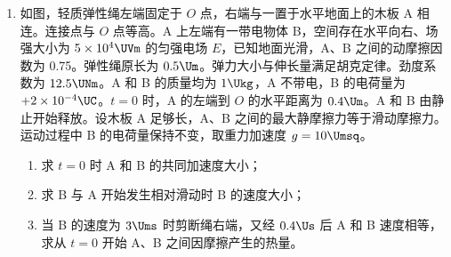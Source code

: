 \documentclass[\gkver]{gaokaozhenti}
\begin{document}
\begin{enumerate}
{（2）入射点 A 到中心线 $O_{1}O_{2}$ 的竖直距离为 $\frac{\sqrt{3}}{2}R$，圆形区域 Ⅱ 的圆心 O 在中心线上，因此 $OA$ 与水平中心线的夹角满足 $\sin\theta=\frac{\frac{\sqrt{3}R}{2}}{R}=\frac{\sqrt{3}}{2}$，即 $\theta=60^{\circ}$。

由于 A、C 关于 $O_{1}O_{2}$ 对称，粒子在区域 Ⅱ 中轨迹对应的圆心角为 $180^{\circ}$，由几何关系可得粒子做圆周运动的轨道半径 $r_{1}=R\sin 60^{\circ}=\frac{\sqrt{3}R}{2}$。

洛伦兹力提供向心力：$qv_{0}B_{2}=m\frac{v_{0}^{2}}{r_{1}}$，得 $B_{2}=\frac{2\sqrt{3}mv_{0}}{3qR}$。

粒子在磁场中运动的周期 $T=\frac{2\pi m}{qB_{2}}$，轨迹圆心角为 $\pi$，因此运动时间 $t=\frac{1}{2}T=\frac{\sqrt{3}\pi R}{2v_{0}}$。

（3）调整后粒子从 A 点水平向右入射，从与 O 等高的 D 点射出区域 Ⅱ，由几何关系 $\left(r_{2}-\frac{\sqrt{3}}{2}R\right)^{2}+\left(R+\frac{\sqrt{3}}{2}R\tan 30^{\circ}\right)^{2}=r_{2}^{2}$，得轨道半径 $r_{2}=\sqrt{3}R$。


代入洛伦兹向心力公式 $qv_{0}B_{2}'=m\frac{v_{0}^{2}}{r_{2}}$，得 $B_{2}'=\frac{\sqrt{3}mv_{0}}{3qR}$。
}

\item
如图，轻质弹性绳左端固定于 $O$ 点，右端与一置于水平地面上的木板 A 相连。连接点与 $O$ 点等高。A 上左端有一带电物体 B，空间存在水平向右、场强大小为 $5\times10^{4} \UVm$ 的匀强电场 $E$，已知地面光滑，A、B 之间的动摩擦因数为 0.75。弹性绳原长为 $0.5 \Um$。弹力大小与伸长量满足胡克定律。劲度系数为 $12.5 \UNm$。A 和 B 的质量均为 $1 \Ukg$，A 不带电，B 的电荷量为 $+2\times10^{-4} \UC$。$t = 0$ 时，A 的左端到 $O$ 的水平距离为 $0.4 \Um$。A 和 B 由静止开始释放。设木板 A 足够长，A、B 之间的最大静摩擦力等于滑动摩擦力。运动过程中 B 的电荷量保持不变，取重力加速度 $g = 10 \Umsq$。
\begin{enumerate}
	\item
	求 $t = 0$ 时 A 和 B 的共同加速度大小；
	\item
	求 B 与 A 开始发生相对滑动时 B 的速度大小；
	\item
	当 B 的速度为 $3 \Ums$ 时剪断绳右端，又经 $0.4 \Us$ 后 A 和 B 速度相等，求从 $t = 0$ 开始 A、B 之间因摩擦产生的热量。
\end{enumerate}


\end{enumerate}
\end{document}
